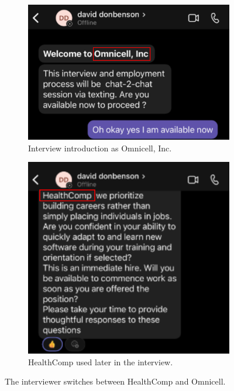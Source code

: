 \begin{fullwidth}
    \begin{figure}[H] %
        \label{sec:Fig9}
        \centering
        \begin{subfigure}{0.5\textwidth}
            \centering
            \includegraphics[width=1.37\linewidth]{assets/Omnicell.png}
            \captionsetup{justification=centering}
            \caption{Interview introduction as Omnicell, Inc.}
        \end{subfigure}
        \hfill
        \begin{subfigure}{0.5\textwidth}
            \centering
            \includegraphics[width=1.37\linewidth]{assets/switchToHealthcomp.png}
            \captionsetup{justification=centering}
            \caption{HealthComp used later in the interview.}
        \end{subfigure}
        \hfill
        \captionsetup{justification=centering}
        \caption{The interviewer switches between HealthComp and Omnicell.}
    \end{figure}



\end{fullwidth}
